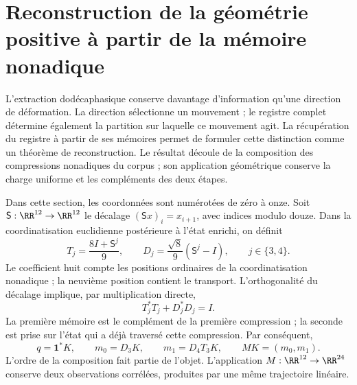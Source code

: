 \section{Reconstruction de la géométrie positive à partir de la mémoire nonadique}
\label{sec:memory}

L'extraction dodécaphasique conserve davantage d'information qu'une direction de déformation. La direction sélectionne un mouvement ; le registre complet détermine également la partition sur laquelle ce mouvement agit. La récupération du registre à partir de ses mémoires permet de formuler cette distinction comme un théorème de reconstruction. Le résultat découle de la composition des compressions nonadiques du corpus \cite{hmtX} ; son application géométrique conserve la charge uniforme et les compléments des deux étapes.

Dans cette section, les coordonnées sont numérotées de zéro à onze. Soit \(\mathsf S:\RR^{12}\to\RR^{12}\) le décalage \((\mathsf Sx)_i=x_{i+1}\), avec indices modulo douze. Dans la coordinatisation euclidienne postérieure à l'état enrichi, on définit
\[
 T_j=\frac{8I+\mathsf S^j}{9},\qquad
 D_j=\frac{\sqrt8}{9}(\mathsf S^j-I),\qquad j\in\{3,4\}.
\]
Le coefficient huit compte les positions ordinaires de la coordinatisation nonadique ; la neuvième position contient le transport. L'orthogonalité du décalage implique, par multiplication directe,
\[
 T_j^*T_j+D_j^*D_j=I.
\]
La première mémoire est le complément de la première compression ; la seconde
est prise sur l’état qui a déjà traversé cette compression. Par conséquent,
\begin{equation}
 q=\mathbf1^*K,\qquad m_0=D_3K,\qquad m_1=D_4T_3K,
 \qquad MK=(m_0,m_1).
 \label{eq:mem-data}
\end{equation}
L’ordre de la composition fait partie de l’objet. L’application
\(M:\RR^{12}\to\RR^{24}\) conserve deux observations corrélées,
produites par une même trajectoire linéaire.

